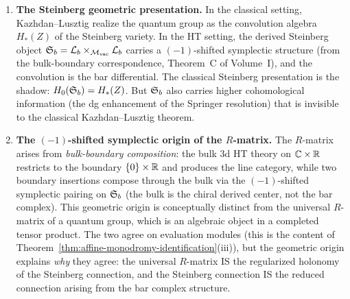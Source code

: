 \begin{enumerate}[label=\textup{(\Roman*)}]
The passage from the HT line category to the factorization quantum
group is controlled by the dg-shifted Yangian strictification
criterion (Theorem~\ref{thm:complete-strictification}): the
quasi-factorization quantum group of Theorem~\ref{thm:quasi-factorization}
is strict exactly on the vanishing locus of the root-sector scalar
classes
$[\epsilon_{\alpha,n}]\in
\mathscr K_n/\operatorname{im}(\delta_{\alpha,n})$, with path sectors
already zero by the $1/n$ BCH and $n$-gon rigidity calculation.

\item \textbf{The Steinberg geometric presentation.}
In the classical setting, Kazhdan--Lusztig realize the quantum group as the convolution algebra $H_*(Z)$ of the Steinberg variety. In the HT setting, the derived Steinberg object $\mathfrak{S}_b = \mathcal{L}_b \times_{\mathcal{M}_{\mathrm{vac}}} \mathcal{L}_b$ carries a $(-1)$-shifted symplectic structure (from the bulk-boundary correspondence, Theorem~C of Volume~I), and the convolution is the bar differential. The classical Steinberg presentation is the shadow: $H_0(\mathfrak{S}_b) = H_*(Z)$. But $\mathfrak{S}_b$ also carries higher cohomological information (the dg enhancement of the Springer resolution) that is invisible to the classical Kazhdan--Lusztig theorem.

\item \textbf{The $(-1)$-shifted symplectic origin of the $R$-matrix.}
The $R$-matrix arises from \emph{bulk-boundary composition}: the bulk 3d HT theory on $\mathbb C \times \mathbb R$ restricts to the boundary $\{0\} \times \mathbb R$ and produces the line category, while two boundary insertions compose through the bulk via the $(-1)$-shifted symplectic pairing on $\mathfrak{S}_b$ (the bulk is the chiral derived center, not the bar complex). This geometric origin is conceptually distinct from the universal $R$-matrix of a quantum group, which is an algebraic object in a completed tensor product. The two agree on evaluation modules (this is the content of Theorem~\ref{thm:affine-monodromy-identification}(iii)), but the geometric origin explains \emph{why} they agree: the universal $R$-matrix IS the regularized holonomy of the Steinberg connection, and the Steinberg connection IS the reduced connection arising from the bar complex structure.
\end{enumerate}

